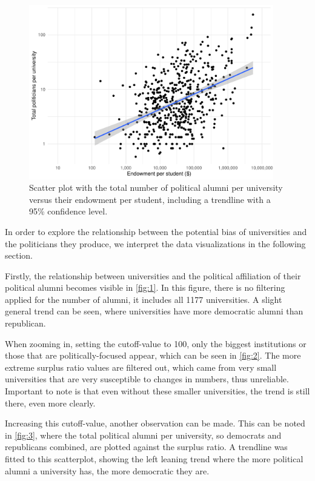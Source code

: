\documentclass{article}
\begin{document}
\begin{figure}[b]
    \centering
    \includegraphics[width=0.95\textwidth]{images/7 endowment_vs_total_politicians.pdf}
    \caption{Scatter plot with the total number of political alumni per university versus their endowment per student, including a trendline with a 95\% confidence level.}
    \label{fig:7}
\end{figure}

In order to explore the relationship between the potential bias of universities and the politicians they produce, we interpret the data visualizations in the following section.

Firstly, the relationship between universities and the political affiliation of their political alumni becomes visible in \autoref{fig:1}. In this figure, there is no filtering applied for the number of alumni, it includes all 1177 universities. A slight general trend can be seen, where universities have more democratic alumni than republican. 

When zooming in, setting the cutoff-value to 100, only the biggest institutions or those that are politically-focused appear, which can be seen in \autoref{fig:2}. The more extreme surplus ratio values are filtered out, which came from very small universities that are very susceptible to changes in numbers, thus unreliable. Important to note is that even without these smaller universities, the trend is still there, even more clearly. 

Increasing this cutoff-value, another observation can be made. This can be noted in \autoref{fig:3}, where the total political alumni per university, so democrats and republicans combined, are plotted against the surplus ratio. A trendline was fitted to this scatterplot, showing the left leaning trend where the more political alumni a university has, the more democratic they are.
\end{document}
